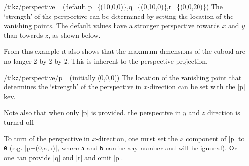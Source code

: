 \begin{key}{/tikz/perspective=
    (default p=\{(10,0,0)\},q=\{(0,10,0)\},r=\{(0,0,20)\})}
  The `strength' of the perspective can be determined by setting the location of
  the vanishing points. The default values have a stronger perspective towards
  $x$ and $y$ than towards $z$, as shown below.
\begin{codeexample}[]
\end{codeexample}
  From this example it also shows that the maximum dimensions of the cuboid are
  no longer 2 by 2 by 2. This is inherent to the perspective projection.
  \begin{key}{/tikz/perspective/p= (initially (0,0,0))}
    The location of the vanishing point that determines the `strength' of the
    perspective in $x$-direction can be set with the |p| key. 
\begin{codeexample}[]
\end{codeexample}
    Note also that when only |p| is provided, the perspective in $y$ and $z$
    direction is turned off.

    To turn of the perspective in $x$-direction, one must set the $x$ component
    of |p| to \texttt{0} (e.g. |p={(0,a,b)}|, where \texttt{a} and \texttt{b}
    can be any number and will be ignored). Or one can provide |q| and |r| and
    omit |p|.
    

\end{key}
\end{key}
